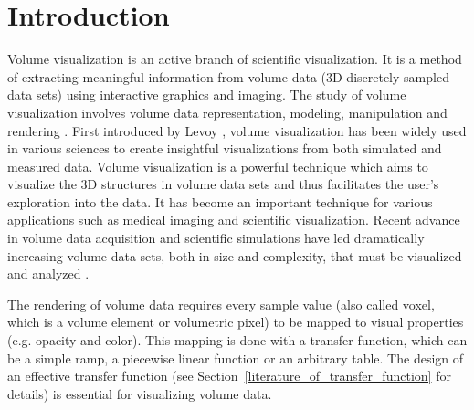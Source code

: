 \chapter{Introduction \label{section_introduction}}

Volume visualization is an active branch of scientific visualization. It is a method of extracting meaningful information from volume data (3D discretely sampled data sets) using interactive graphics and imaging. The study of volume visualization involves volume data representation, modeling, manipulation and rendering \cite{kaufman_volume_1997}.
First introduced by Levoy \cite{levoy_display_1988}, volume visualization has been widely used in various sciences to create insightful visualizations from both simulated and measured data.
Volume visualization is a powerful technique which aims to visualize the 3D structures in volume data sets and thus facilitates the user's exploration into the data. It has become an important technique for various applications such as medical imaging and scientific visualization.
Recent advance in volume data acquisition and scientific simulations have led dramatically increasing volume data sets, both in size and complexity, that must be visualized and analyzed \cite{beyer_state---art_2015}.


The rendering of volume data requires every sample value (also called voxel, which is a volume element or volumetric pixel) to be mapped to visual properties (e.g. opacity and color). This mapping is done with a transfer function, which can be a simple ramp, a piecewise linear function or an arbitrary table.
The design of an effective transfer function (see Section~\ref{literature_of_transfer_function} for details) is essential for visualizing volume data.

